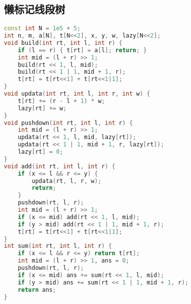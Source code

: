 \subsection{懒标记线段树}
  \begin{lstlisting}[language=c++]
const int N = 1e5 + 5;
int n, m, a[N], t[N<<2], x, y, w, lazy[N<<2];
void build(int rt, int l, int r) {
    if (l == r) { t[rt] = a[l]; return; }
    int mid = (l + r) >> 1;
    build(rt << 1, l, mid);
    build(rt << 1 | 1, mid + 1, r);
    t[rt] = t[rt<<1] + t[rt<<1|1];
}
void updata(int rt, int l, int r, int w) {
    t[rt] += (r - l + 1) * w;
    lazy[rt] += w;
}
void pushdown(int rt, int l, int r) {
    int mid = (l + r) >> 1;
    updata(rt << 1, l, mid, lazy[rt]);
    updata(rt << 1 | 1, mid + 1, r, lazy[rt]);
    lazy[rt] = 0;
}
void add(int rt, int l, int r) {
    if (x <= l && r <= y) {
        updata(rt, l, r, w);
        return;
    }
    pushdown(rt, l, r);
    int mid = (l + r) >> 1;
    if (x <= mid) add(rt << 1, l, mid);
    if (y > mid) add(rt << 1 | 1, mid + 1, r);
    t[rt] = t[rt<<1] + t[rt<<1|1];
}
int sum(int rt, int l, int r) {
    if (x <= l && r <= y) return t[rt];
    int mid = (l + r) >> 1, ans = 0;
    pushdown(rt, l, r);
    if (x <= mid) ans += sum(rt << 1, l, mid);
    if (y > mid) ans += sum(rt << 1 | 1, mid + 1, r);
    return ans;
}
  \end{lstlisting}
